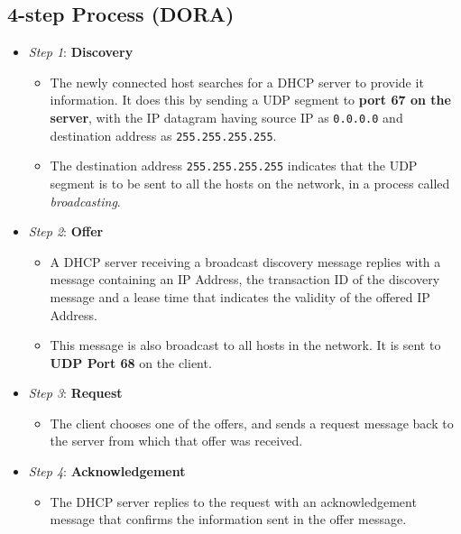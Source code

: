\documentclass[a4paper]{article}
\theoremstyle{plain}
\theoremstyle{definition}
\begin{document}
\subsection{4-step Process (DORA)}
\begin{itemize}
    \item \textit{Step 1}: \textbf{Discovery}
    \begin{itemize}
        \item The newly connected host searches for a DHCP server to provide it information. It does this by sending a UDP segment to \textbf{port 67 on the server}, with the IP datagram having source IP as \texttt{0.0.0.0} and destination address as \texttt{255.255.255.255}.
        
        \item The destination address \texttt{255.255.255.255} indicates that the UDP segment is to be sent to all the hosts on the network, in a process called \textit{broadcasting}. 
    \end{itemize}
    
    \item \textit{Step 2}: \textbf{Offer}
    \begin{itemize}
        \item A DHCP server receiving a broadcast discovery message replies with a message containing an IP Address, the transaction ID of the discovery message and a lease time that indicates the validity of the offered IP Address. 
        
        \item This message is also broadcast to all hosts in the network. It is sent to \textbf{UDP Port 68} on the client.  
    \end{itemize}
    
    \item \textit{Step 3}: \textbf{Request}
    \begin{itemize}
        \item The client chooses one of the offers, and sends a request message back to the server from which that offer was received. 
    \end{itemize}
    
    \item \textit{Step 4}: \textbf{Acknowledgement}
    \begin{itemize}
        \item The DHCP server replies to the request with an acknowledgement message that confirms the information sent in the offer message. 
    \end{itemize}
\end{itemize}
\end{document}
